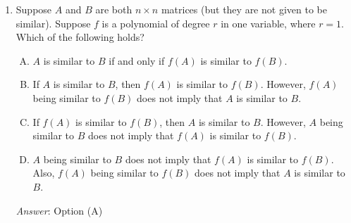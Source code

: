 \documentclass[10pt]{amsart}
\begin{document}
\begin{enumerate}
  \begin{enumerate}[(A)]
  \item $A$ is similar to $B$ if and only if $f(A)$ is similar to
    $f(B)$.
  \item If $A$ is similar to $B$, then $f(A)$ is similar to
    $f(B)$. However, $f(A)$ being similar to $f(B)$ does not
    imply that $A$ is similar to $B$.
  \item If $f(A)$ is similar to $f(B)$, then $A$ is similar to
    $B$. However, $A$ being similar to $B$ does not imply that $f(A)$
    is similar to $f(B)$.
  \item $A$ being similar to $B$ does not imply that $f(A)$ is
    similar to $f(B)$. Also, $f(A)$ being similar to $f(B)$
    does not imply that $A$ is similar to $B$.
  \end{enumerate}

  {\em Answer}: Option (B)

  {\em Explanation}: For the forward direction, note that $A =
  SBS^{-1}$ implies that $f(A) = Sf(B)S^{-1}$. For the breakdown of
  the reverse direction, see the explanation for Q8 of the November 27
  quiz. This covers the $f(x) = x^2$ case. Similar examples can be
  constructed for other polynomials.

  {\em Performance review}: 16 out of 25 got this. 4 chose (D), 3
  chose (A), 2 chose (C).
\item Suppose $A$ and $B$ are both $n \times n$ matrices (but they are
  not given to be similar). Suppose $f$ is a polynomial of degree $r$
  in one variable, where $r = 1$. Which of the following holds?

  \begin{enumerate}[(A)]
  \item $A$ is similar to $B$ if and only if $f(A)$ is similar to
    $f(B)$.
  \item If $A$ is similar to $B$, then $f(A)$ is similar to
    $f(B)$. However, $f(A)$ being similar to $f(B)$ does not
    imply that $A$ is similar to $B$.
  \item If $f(A)$ is similar to $f(B)$, then $A$ is similar to
    $B$. However, $A$ being similar to $B$ does not imply that $f(A)$
    is similar to $f(B)$.
  \item $A$ being similar to $B$ does not imply that $f(A)$ is
    similar to $f(B)$. Also, $f(A)$ being similar to $f(B)$
    does not imply that $A$ is similar to $B$.
  \end{enumerate}

  {\em Answer}: Option (A)


\end{enumerate}
\end{document}

